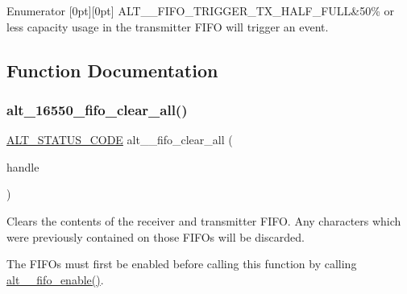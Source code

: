 \begin{DoxyEnumFields}{Enumerator}
[0pt][0pt]{}\mbox{\label{group__UART__FIFO_ggaeef8e1e6b4ec8b82200067bf4ba2e04eaa7a95884e49b3ba2772b48aa5f5bea37}} 
A\+L\+T\+\_\+\_\+\+F\+I\+F\+O\+\_\+\+T\+R\+I\+G\+G\+E\+R\+\_\+\+T\+X\+\_\+\+H\+A\+L\+F\+\_\+\+F\+U\+LL&50\% or less capacity usage in the transmitter F\+I\+FO will trigger an event. \\
\hline

\end{DoxyEnumFields}


\subsection{Function Documentation}
\mbox{\label{group__UART__FIFO_gaec47f311df9de1dc2ce0a94dc88962ac}} 
\subsubsection{\texorpdfstring{alt\_16550\_fifo\_clear\_all()}{alt\_16550\_fifo\_clear\_all()}}
{\footnotesize\ttfamily \mbox{\hyperlink{hwlib_8h_abdb0d369f069723ca55d6c94bcaaaa12}{A\+L\+T\+\_\+\+S\+T\+A\+T\+U\+S\+\_\+\+C\+O\+DE}} alt\+\_\+\_\+fifo\+\_\+clear\+\_\+all (\begin{DoxyParamCaption}\item[{\mbox{\hyperlink{group__UART__BASIC_ga4173f362f19fc04032c3859b78d78119}{A\+L\+T\+\_\+16550\+\_\+\+H\+A\+N\+D\+L\+E\+\_\+t}} $\ast$}]{handle }\end{DoxyParamCaption})}

Clears the contents of the receiver and transmitter F\+I\+FO. Any characters which were previously contained on those F\+I\+F\+Os will be discarded.

The F\+I\+F\+Os must first be enabled before calling this function by calling \mbox{\hyperlink{group__UART__FIFO_ga66e1f9e3c9e6f721699a780b763d2740}{alt\+\_\+\_\+fifo\+\_\+enable()}}.


